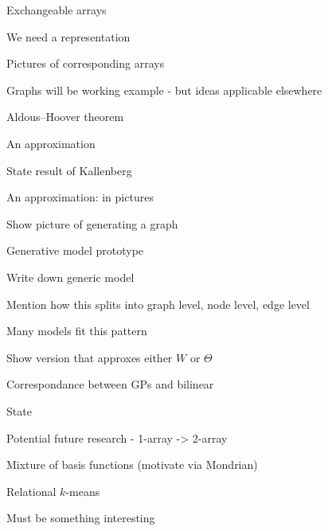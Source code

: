 \begin{frame}{Exchangeable arrays}
  \begin{block}{}
    We need a representation
  
    Pictures of corresponding arrays
    
    Graphs will be working example - but ideas applicable elsewhere
  \end{block}
\end{frame}

\begin{frame}{Aldous--Hoover theorem}
  \begin{block}{}
  \end{block}
\end{frame}

\begin{frame}{An approximation}
  \begin{block}{}
    State result of Kallenberg
  \end{block}
\end{frame}

\begin{frame}{An approximation: in pictures}
  \begin{block}{}
    Show picture of generating a graph
  \end{block}
\end{frame}

\begin{frame}{Generative model prototype}
  \begin{block}{}
    Write down generic model
    
    Mention how this splits into graph level, node level, edge level
  \end{block}
\end{frame}

\begin{frame}{Many models fit this pattern}
  \begin{block}{}
    Show version that approxes either $W$ or $\Theta$
  \end{block}
\end{frame}

\begin{frame}{Correspondance between GPs and bilinear}
  \begin{block}{}
    State 
  \end{block}
\end{frame}

\begin{frame}{Potential future research - 1-array -> 2-array}
  \begin{block}{}
    \eg Mixture of basis functions (motivate via Mondrian)
    
    Relational $k$-means
    
    Must be something interesting
  \end{block}
\end{frame}

